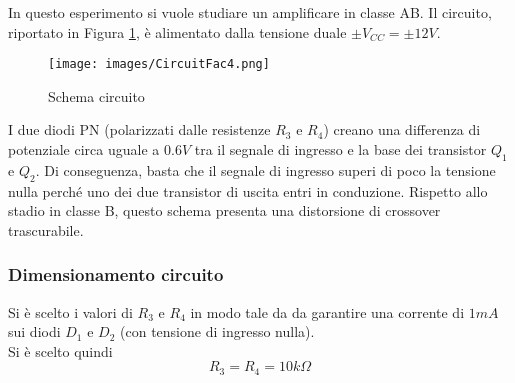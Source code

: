 In questo esperimento si vuole studiare un amplificare in classe AB. Il circuito, riportato in Figura \ref{fig:CircuitFac4}, è alimentato dalla tensione duale $\pm V_{CC}=\pm 12V$.
\begin{figure}[H]
    \centering
    \texttt{[image: images/CircuitFac4.png]}
    \caption{Schema circuito}
    \label{fig:CircuitFac4}
\end{figure}
I due diodi PN (polarizzati dalle resistenze $R_3$ e $R_4$) creano una differenza di potenziale circa uguale a $0.6 V$ tra il segnale di ingresso e la base dei transistor $Q_1$ e $Q_2$. Di conseguenza, basta che il segnale di ingresso superi di poco la tensione nulla perché uno dei due transistor di uscita entri in conduzione. Rispetto allo stadio in classe B, questo schema presenta una distorsione di crossover trascurabile.
\subsubsection{Dimensionamento circuito}
Si è scelto i valori di $R_3$ e $R_4$ in modo tale da da garantire una corrente di $1 mA$ sui diodi $D_1$ e $D_2$ (con tensione di ingresso nulla).\\
Si è scelto quindi
\begin{equation*}
    R_3=R_4=10k\Omega
\end{equation*}
